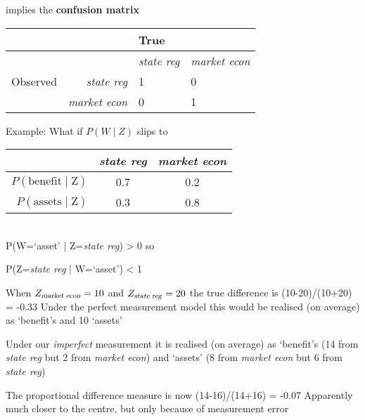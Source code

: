 \documentclass{mediumfoils}
\begin{document}

implies the \textbf{confusion matrix} 

\begin{center}
\begin{tabular}{lrll} \toprule
        & & True & \\\midrule
        & & \textsl{state reg} & \textsl{market econ} \\ \midrule
Observed & \textsl{state reg}  & 1      & 0 \\ 
     & \textsl{market econ}  & 0      & 1 \\ \bottomrule
\end{tabular}
\end{center}





Example: What if $P(W \mid Z)$ slips to
\begin{center}
\begin{tabular}{rcc} \toprule
 & \textsl{state reg} & \textsl{market econ} \\ \midrule
$P(\text{benefit} \mid \text{Z})$ & 0.7 & 0.2 \\
$P(\text{assets} \mid  \text{Z})$ & 0.3 & 0.8 \\ \bottomrule
\end{tabular}
\end{center}

~\\
P(W=`asset' | Z=\textsl{state reg}) > 0 so

P(Z=\textsl{state reg} | W=`asset') < 1


When $Z_{\text{\textsl{market econ}}}=10$ and $Z_{\text{\textsl{state reg}}}=20$ the true difference is 
\ita
\itm (10-20)/(10+20) = -0.33
\itz
Under the perfect measurement model this would be realised (on average) as 
\ita
{} `benefit's and 10 `assets'
\itz


Under our \textit{imperfect} measurement it is realised (on average) as 
\ita
{} `benefit's (14 from \textsl{state reg} but 2 from \textsl{market econ}) and
 `assets' (8 from \textsl{market econ} but 6 from \textsl{state reg})
\itz


The proportional difference measure is now (14-16)/(14+16) = -0.07
\ita
\itm Apparently much closer to the centre, but only because of measurement error
\itz
\end{document}
